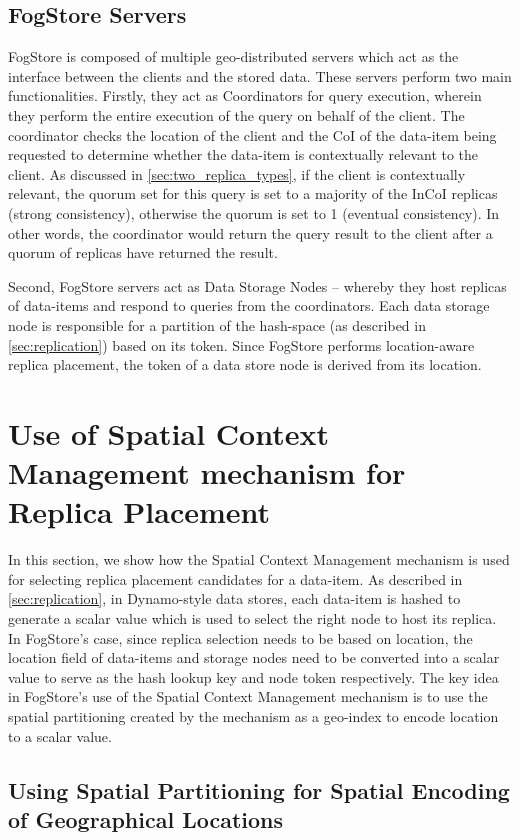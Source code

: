 \subsection{FogStore Servers}
FogStore is composed of multiple geo-distributed servers which act as the interface between the clients and the stored data. These servers perform two main functionalities. Firstly, they act as Coordinators for query execution, wherein they perform  the entire execution of the query on behalf of the client. The coordinator checks the location of the client and the CoI of the data-item being requested to determine whether the data-item is contextually relevant to the client. As discussed in \cref{sec:two_replica_types}, if the client is contextually relevant, the quorum set for this query is set to a majority of the InCoI replicas (strong consistency), otherwise the quorum is set to 1 (eventual consistency). In other words, the coordinator would return the query result to the client after a quorum of replicas have returned the result.
\par Second, FogStore servers act as Data Storage Nodes -- whereby they host replicas of data-items and respond to queries from the coordinators. Each data storage node is responsible for a partition of the hash-space (as described in \cref{sec:replication}) based on its token. Since FogStore performs location-aware replica placement, the token of a data store node is derived from its location.

\section{Use of Spatial Context Management mechanism for Replica Placement}
\label{sec:replica_placement}
In this section, we show how the Spatial Context Management mechanism is used for selecting replica placement candidates for a data-item. As described in \cref{sec:replication}, in Dynamo-style data stores, each data-item is hashed to generate a scalar value which is used to select the right node to host its replica. In FogStore's case, since replica selection needs to be based on location, the location field of data-items and storage nodes need to be converted into a scalar value to serve as the hash lookup key and node token respectively. The key idea in FogStore's use of the Spatial Context Management mechanism is to use the spatial partitioning created by the mechanism as a geo-index to encode location to a scalar value.

\subsection{Using Spatial Partitioning for Spatial Encoding of Geographical Locations}
\label{sec:geoindexing}

